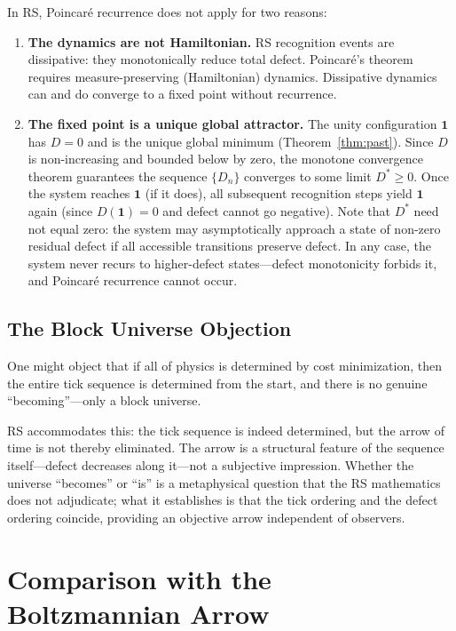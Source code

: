 \documentclass[12pt,a4paper]{article}
\theoremstyle{definition}
\theoremstyle{remark}
\begin{document}
In RS, Poincar\'e recurrence does not apply for two reasons:
\begin{enumerate}[nosep]
  \item \textbf{The dynamics are not Hamiltonian.}  RS recognition
  events are dissipative: they monotonically reduce total defect.
  Poincar\'e's theorem requires measure-preserving (Hamiltonian)
  dynamics.  Dissipative dynamics can and do converge to a fixed point
  without recurrence.
  \item \textbf{The fixed point is a unique global attractor.}  The
  unity configuration $\mathbf{1}$ has $D = 0$ and is the unique global
  minimum (Theorem~\ref{thm:past}).  Since $D$ is non-increasing and
  bounded below by zero, the monotone convergence theorem guarantees
  the sequence $\{D_n\}$ converges to some limit $D^* \geq 0$.  Once
  the system reaches $\mathbf{1}$ (if it does), all subsequent
  recognition steps yield $\mathbf{1}$ again (since $D(\mathbf{1}) = 0$
  and defect cannot go negative).  Note that $D^*$ need not equal zero:
  the system may asymptotically approach a state of non-zero residual
  defect if all accessible transitions preserve defect.  In any case,
  the system never recurs to higher-defect states---defect monotonicity
  forbids it, and Poincar\'e recurrence cannot occur.
\end{enumerate}

\subsection{The Block Universe Objection}

One might object that if all of physics is determined by cost
minimization, then the entire tick sequence is determined from the
start, and there is no genuine ``becoming''---only a block universe.

RS accommodates this: the tick sequence is indeed determined, but the
arrow of time is not thereby eliminated.  The arrow is a structural
feature of the sequence itself---defect decreases along it---not a
subjective impression.  Whether the universe ``becomes'' or ``is'' is a
metaphysical question that the RS mathematics does not adjudicate; what
it establishes is that the tick ordering and the defect ordering
coincide, providing an objective arrow independent of observers.

\section{Comparison with the Boltzmannian Arrow}
\label{sec:compare}
\end{document}
